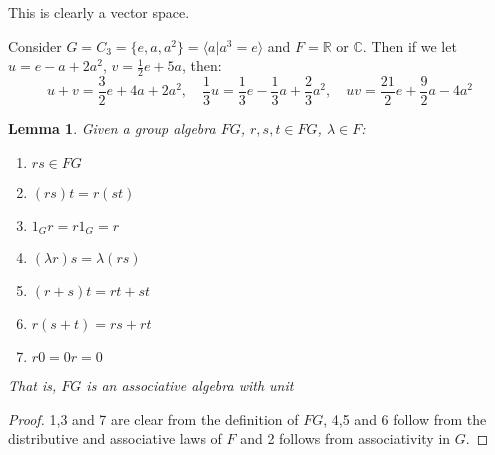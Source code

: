 \documentclass[11pt, notitlepage]{article}
\numberwithin{equation}{section}
\theoremstyle{plain}
\newtheorem{lemma}[theorem]{Lemma}
\theoremstyle{definition}
\newenvironment{example}
	{\pushQED{\qed}\renewcommand{\qedsymbol}{$\blacktriangleleft$}\examplex}
	{\popQED\endexamplex}
\newcommand{\R}{\mathbb{R}}
\newcommand{\C}{\mathbb{C}}
\begin{document}
This is clearly a vector space.

\begin{example}
	Consider $G = C_3 = \{e,a,a^2\} = \langle a|a^3=e\rangle$ and $F=\R$ or $\C$. Then if we let $u = e-a+2a^2$, $v=\frac{1}{2}e+5a$, then:
	\[u+v = \frac{3}{2}e+4a+2a^2,\quad \frac{1}{3}u = \frac{1}{3}e-\frac{1}{3}a+\frac{2}{3}a^2,\quad uv = \frac{21}{2}e+\frac{9}{2}a-4a^2\]
\end{example}
\begin{lemma}\label{le:3.6}
	Given a group algebra $FG$, $r,s,t\in FG$, $\lambda\in F$:
	\begin{enumerate}[label=\emph{(\Roman*)}]
		\item $rs\in FG$
		\item $(rs)t = r(st)$
		\item $1_Gr=r1_G=r$
		\item $(\lambda r)s=\lambda(rs)$
		\item $(r+s)t=rt+st$
		\item $r(s+t)=rs+rt$
		\item $r0=0r=0$
	\end{enumerate}
That is, $FG$ is an associative algebra with unit
\end{lemma}
\begin{proof}
	1,3 and 7 are clear from the definition of $FG$, 4,5 and 6 follow from the distributive and associative laws of $F$ and 2 follows from associativity in $G$.
\end{proof}
\end{document}
